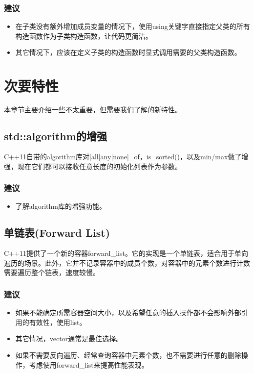 \documentclass{ctexart}
\begin{document}
\subsubsection*{建议}

\begin{itemize}
	\item 在子类没有额外增加成员变量的情况下，使用using关键字直接指定父类的所有构造函数作为子类构造函数，让代码更简洁。
	\item 其它情况下，应该在定义子类的构造函数时显式调用需要的父类构造函数。
\end{itemize}

\newpage
\section{次要特性}

本章节主要介绍一些不太重要，但需要我们了解的新特性。

\subsection{std::algorithm的增强}

C++11自带的algorithm库对[all|any|none]\_of，is\_sorted()，以及min/max做了增强，现在它们都可以接收任意长度的初始化列表作为参数。

\subsubsection*{建议}

\begin{itemize}
	\item 了解algorithm库的增强功能。
\end{itemize}

\subsection{单链表(Forward List)}

C++11提供了一个新的容器forward\_list。它的实现是一个单链表，适合用于单向遍历的场景。此外，它并不记录容器中的成员个数，对容器中的元素个数进行计数需要遍历整个链表，速度较慢。

\subsubsection*{建议}

\begin{itemize}
	\item 如果不能确定所需容器空间大小，以及希望任意的插入操作都不会影响外部引用的有效性，使用list。
	\item 其它情况，vector通常是最佳选择。
	\item 如果不需要反向遍历、经常查询容器中元素个数，也不需要进行任意的删除操作，考虑使用forward\_list来提高性能表现。
\end{itemize}
\end{document}
